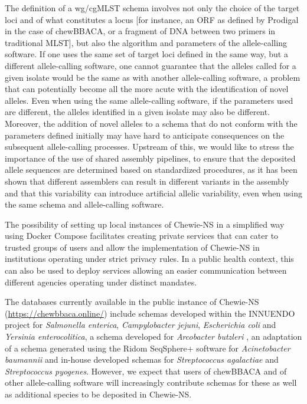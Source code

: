 The definition of a \ac{wg/cgMLST} schema involves not only the choice of the target loci and of what constitutes a locus [for instance, an \ac{ORF} as defined by Prodigal \cite{hyatt_prodigal_2010} in the case of chewBBACA, or a fragment of \ac{DNA} between two primers in traditional \ac{MLST}], but also the algorithm and parameters of the allele-calling software. If one uses the same set of target loci defined in the same way, but a different allele-calling software, one cannot guarantee that the alleles called for a given isolate would be the same as with another allele-calling software, a problem that can potentially become all the more acute with the identification of novel alleles. Even when using the same allele-calling software, if the parameters used are different, the alleles identified in a given isolate may also be different. Moreover, the addition of novel alleles to a schema that do not conform with the parameters defined initially may have hard to anticipate consequences on the subsequent allele-calling processes. Upstream of this, we would like to stress the importance of the use of shared assembly pipelines, to ensure that the deposited allele sequences are determined based on standardized procedures, as it has been shown that different assemblers can result in different variants in the assembly \cite{firtina_apollo_2020} and that this variability can introduce artificial allelic variability, even when using the same schema and allele-calling software.

The possibility of setting up local instances of \ac{Chewie-NS} in a simplified way using Docker Compose facilitates creating private services that can cater to trusted groups of users and allow the implementation of \ac{Chewie-NS} in institutions operating under strict privacy rules. In a public health context, this can also be used to deploy services allowing an easier communication between different agencies operating under distinct mandates.

The databases currently available in the public instance of \ac{Chewie-NS} (\url{https://chewbbaca.online/}) include schemas developed within the INNUENDO project \cite{llarena_innuendo_2018} for \textit{Salmonella enterica}, \textit{Campylobacter jejuni}, \textit{Escherichia coli} and \textit{Yersinia enterocolitica}, a schema developed for \textit{Arcobacter butzleri} \cite{isidro_virulence_2020}, an adaptation of a schema generated using the Ridom SeqSphere+ software for \textit{Acinetobacter baumannii} \cite{higgins_development_2017} and in-house developed schemas for \textit{Streptococcus agalactiae} and \textit{Streptococcus pyogenes}. However, we expect that users of chewBBACA and of other allele-calling software will increasingly contribute schemas for these as well as additional species to be deposited in \ac{Chewie-NS}.

